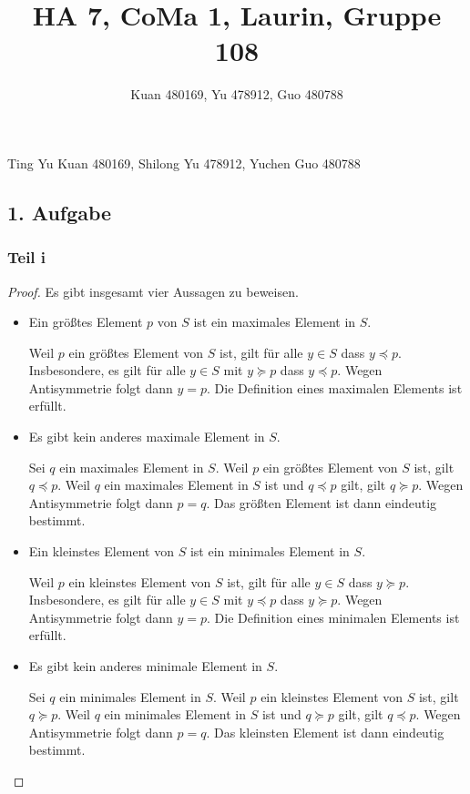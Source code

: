 \documentclass[a5paper]{article}
\title{HA 7, CoMa 1, Laurin, Gruppe 108}
\author{Kuan 480169, Yu 478912, Guo 480788}
\theoremstyle{remark}
\begin{document}
\maketitle
\begin{center}
Ting Yu Kuan 480169, Shilong Yu 478912, Yuchen Guo 480788
\end{center}
\newpage
\subsection{1. Aufgabe}
\subsubsection{Teil i}
\begin{proof}
Es gibt insgesamt vier Aussagen zu beweisen.

\begin{itemize}
\item Ein größtes Element \(p\) von \(S\) ist ein maximales
  Element in \(S\).

  Weil \(p\) ein größtes Element von \(S\) ist, gilt für
  alle \(y \in S\) dass \(y \preceq p\).  Insbesondere, es
  gilt für alle \(y \in S\) mit \(y \succeq p\) dass
  \(y \preceq p\).  Wegen Antisymmetrie folgt dann
  \(y = p\).  Die Definition eines maximalen Elements ist
  erfüllt.
\item Es gibt kein anderes maximale Element in \(S\).

  Sei \(q\) ein maximales Element in \(S\).  Weil \(p\) ein
  größtes Element von \(S\) ist, gilt \(q \preceq p\).  Weil
  \(q\) ein maximales Element in \(S\) ist und
  \(q \preceq p\) gilt, gilt \(q \succeq p\).  Wegen
  Antisymmetrie folgt dann \(p = q\).  Das größten Element
  ist dann eindeutig bestimmt.
\item Ein kleinstes Element von \(S\) ist ein
  minimales Element in \(S\).

  Weil \(p\) ein kleinstes Element von \(S\) ist, gilt für
  alle \(y \in S\) dass \(y \succeq p\).  Insbesondere, es
  gilt für alle \(y \in S\) mit \(y \preceq p\) dass
  \(y \succeq p\).  Wegen Antisymmetrie folgt dann
  \(y = p\).  Die Definition eines minimalen Elements ist
  erfüllt.
\item Es gibt kein anderes minimale Element in \(S\).

  Sei \(q\) ein minimales Element in \(S\).  Weil \(p\) ein
  kleinstes Element von \(S\) ist, gilt \(q \succeq p\).
  Weil \(q\) ein minimales Element in \(S\) ist und
  \(q \succeq p\) gilt, gilt \(q \preceq p\).  Wegen
  Antisymmetrie folgt dann \(p = q\).  Das kleinsten
  Element ist dann eindeutig bestimmt. \qedhere
\end{itemize}
\end{proof}
\end{document}

